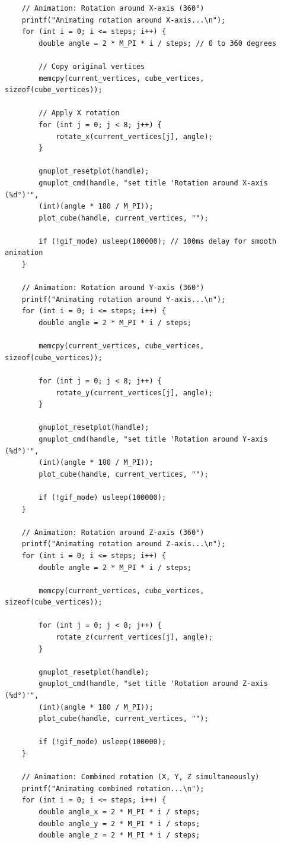 \documentclass[a4paper,10pt]{article}
\begin{document}
\begin{verbatim}
    // Animation: Rotation around X-axis (360°)
    printf("Animating rotation around X-axis...\n");
    for (int i = 0; i <= steps; i++) {
        double angle = 2 * M_PI * i / steps; // 0 to 360 degrees

        // Copy original vertices
        memcpy(current_vertices, cube_vertices, sizeof(cube_vertices));

        // Apply X rotation
        for (int j = 0; j < 8; j++) {
            rotate_x(current_vertices[j], angle);
        }

        gnuplot_resetplot(handle);
        gnuplot_cmd(handle, "set title 'Rotation around X-axis (%d°)'",
        (int)(angle * 180 / M_PI));
        plot_cube(handle, current_vertices, "");

        if (!gif_mode) usleep(100000); // 100ms delay for smooth animation
    }

    // Animation: Rotation around Y-axis (360°)
    printf("Animating rotation around Y-axis...\n");
    for (int i = 0; i <= steps; i++) {
        double angle = 2 * M_PI * i / steps;

        memcpy(current_vertices, cube_vertices, sizeof(cube_vertices));

        for (int j = 0; j < 8; j++) {
            rotate_y(current_vertices[j], angle);
        }

        gnuplot_resetplot(handle);
        gnuplot_cmd(handle, "set title 'Rotation around Y-axis (%d°)'",
        (int)(angle * 180 / M_PI));
        plot_cube(handle, current_vertices, "");

        if (!gif_mode) usleep(100000);
    }

    // Animation: Rotation around Z-axis (360°)
    printf("Animating rotation around Z-axis...\n");
    for (int i = 0; i <= steps; i++) {
        double angle = 2 * M_PI * i / steps;

        memcpy(current_vertices, cube_vertices, sizeof(cube_vertices));

        for (int j = 0; j < 8; j++) {
            rotate_z(current_vertices[j], angle);
        }

        gnuplot_resetplot(handle);
        gnuplot_cmd(handle, "set title 'Rotation around Z-axis (%d°)'",
        (int)(angle * 180 / M_PI));
        plot_cube(handle, current_vertices, "");

        if (!gif_mode) usleep(100000);
    }

    // Animation: Combined rotation (X, Y, Z simultaneously)
    printf("Animating combined rotation...\n");
    for (int i = 0; i <= steps; i++) {
        double angle_x = 2 * M_PI * i / steps;
        double angle_y = 2 * M_PI * i / steps;
        double angle_z = 2 * M_PI * i / steps;


\end{verbatim}
\end{document}
